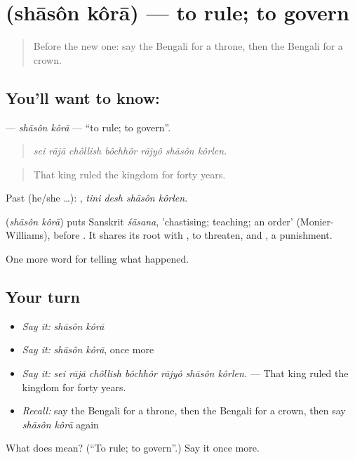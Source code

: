 \section[\texorpdfstring{\bn{শাসন} \bn{করা} (shāsôn kôrā)}{শাসন করা (shāsôn kôrā)}]{  (shāsôn kôrā) — to rule; to govern}

\label{lesson:BN-C313-shason-kora}



\begin{quote}
Before the new one: say the Bengali for a throne, then the Bengali for a crown.
\end{quote}

\subsection*{You'll want to know:  }
\textbf{ } — \emph{shāsôn kôrā} — \textquotedblleft{}to rule; to govern\textquotedblright{}.

\begin{quote}
      
\end{quote}

\begin{quote}
\emph{sei rājā chôllish bôchhôr rājyô shāsôn kôrlen.}
\end{quote}

\begin{quote}
That king ruled the kingdom for forty years.
\end{quote}

Past (he/she …):    , \emph{tini desh shāsôn kôrlen}.

\begin{cousinweb}
\textbf{ } (\emph{shāsôn kôrā}) puts Sanskrit \emph{śāsana}, 'chastising; teaching; an order' (Monier-Williams), before . It shares its root with \textbf{}, to threaten, and \textbf{}, a punishment.
\end{cousinweb}

\begin{grammarlens}[title={What you've built}]
One more word for telling what happened.
\end{grammarlens}

\subsection*{Your turn}
\begin{itemize}
\raggedright
  \item \emph{Say it:} \emph{shāsôn kôrā}
  \item \emph{Say it:} \emph{shāsôn kôrā}, once more
  \item \emph{Say it:} \emph{sei rājā chôllish bôchhôr rājyô shāsôn kôrlen.} — That king ruled the kingdom for forty years.
  \item \emph{Recall:} say the Bengali for a throne, then the Bengali for a crown, then say \emph{shāsôn kôrā} again
\end{itemize}

\begin{tcolorbox}[breakable,colback=teal!4,colframe=teal!35!black,title={Before you move on}]
What does   mean? (\textquotedblleft{}To rule; to govern\textquotedblright{}.) Say it once more.
\end{tcolorbox}
